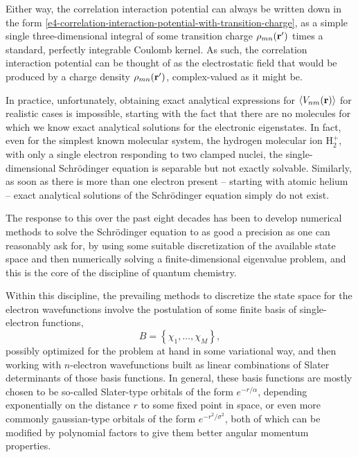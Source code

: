 Either way, the correlation interaction potential can always be written down in the form \eqref{e4-correlation-interaction-potential-with-transition-charge}, as a simple single three-dimensional integral of some transition charge $\rho_{mn}(\vb{r}')$ times a standard, perfectly integrable Coulomb kernel. As such, the correlation interaction potential can be thought of as the electrostatic field that would be produced by a charge density $\rho_{mn}(\vb{r}')$, complex-valued as it might be.



In practice, unfortunately, obtaining exact analytical expressions for $\left\langle V_{nm}\mathopen{}\left( \vb{r} \right)\mathclose{} \right\rangle$ for realistic cases is impossible, starting with the fact that there are no molecules for which we know exact analytical solutions for the electronic eigenstates. In fact, even for the simplest known molecular system, the hydrogen molecular ion H$_2^+$, with only a single electron responding to two clamped nuclei, the single-dimensional Schrödinger equation is separable but not exactly solvable. Similarly, as soon as there is more than one electron present -- starting with atomic helium -- exact analytical solutions of the Schrödinger equation simply do not exist.

The response to this over the past eight decades has been to develop numerical methods to solve the Schrödinger equation to as good a precision as one can reasonably ask for, by using some suitable discretization of the available state space and then numerically solving a finite-dimensional eigenvalue problem, and this is the core of the discipline of quantum chemistry. 

Within this discipline, the prevailing methods to discretize the state space for the electron wavefunctions involve the postulation of some finite basis of single-electron functions,
\begin{equation}
B=\left\{\chi_1,\ldots,\chi_M\right\},
\end{equation}
possibly optimized for the problem at hand in some variational way, and then working with $n$-electron wavefunctions built as linear combinations of Slater determinants of those basis functions. In general, these basis functions are mostly chosen to be so-called Slater-type orbitals of the form $e^{-r/\alpha}$, depending exponentially on the distance $r$ to some fixed point in space, or even more commonly gaussian-type orbitals of the form $e^{-r^2/\sigma^2}$, both of which can be modified by polynomial factors to give them better angular momentum properties.

